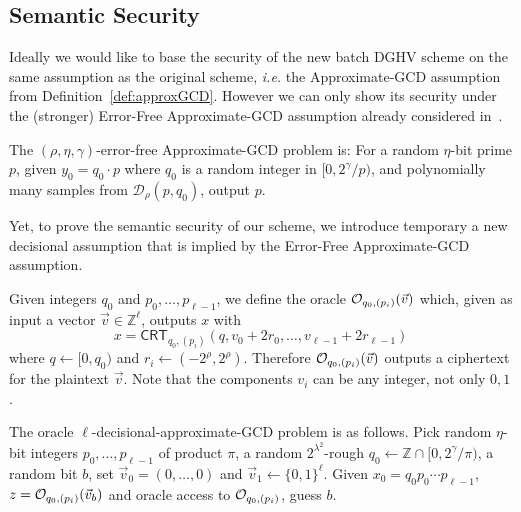 \documentclass[11pt]{llncs}
\newcommand{\ie}{\textsl{i.e.}\xspace}
\newcommand{\Z}{{\mathbb Z}}
\newcommand*{\crt}{\ensuremath{\mathsf{CRT}}}
\begin{document}
\subsection{Semantic Security}\label{sec:semantic-security}

Ideally we would like to base the security of the new batch DGHV scheme on
the same assumption as the original scheme, \ie the
Approximate-GCD assumption from Definition~\ref{def:approxGCD}.
However we can only show its security under the
(stronger) Error-Free Approximate-GCD assumption already considered in~\cite{CMNT2011,CNT2012}.
\begin{definition} 
The $(\rho, \eta,{\gamma})$-error-free Appro\-xi\-ma\-te-GCD pro\-blem
is: For a random $\eta$-bit prime $p$, given $y_0=q_0\cdot p$
where $q_0$ is a random integer in $[0,
  2^{\gamma}/p)$, and polynomially many samples from $\mathcal
  D_\rho(p,q_0)$, output $p$. 
\end{definition} 

Yet, to prove the semantic security of our scheme, 
we introduce temporary a new decisional assumption that is implied by the 
Error-Free Approximate-GCD assumption.

Given integers $q_0$ and $p_0,\ldots,p_{\ell-1}$, we define the oracle
${\cal O}_{q_0,(p_i)}(\vec{v})$ which, given as input a vector $\vec{v} \in {\mathbb
  Z}^\ell$, outputs $x$ with
$$ x = \crt_{q_0,(p_i)}(q,v_0+2r_0,\ldots,v_{\ell-1}+2r_{\ell-1})$$
where $q \leftarrow [0,q_0)$ and $r_i \leftarrow
    (-2^\rho,2^\rho)$. Therefore ${\cal O}_{q_0,(p_i)}(\vec{v})$
    outputs a ciphertext for the plaintext $\vec{v}$. Note that the
    components $v_i$ can be any integer, not only $0,1$.

\begin{definition} The
  oracle $\ell$-decisional-approximate-GCD problem is as
  follows. Pick random $\eta$-bit 
  integers $p_0,\ldots,p_{\ell-1}$ of product $\pi$, a random
  $2^{\lambda^2}$-rough $q_0 \leftarrow \Z \cap  
  [0,2^{\gamma}/\pi)$, a random bit $b$, set $\vec{v}_0=
  (0,\ldots,0)$
and $\vec{v}_1\leftarrow
  \{0,1\}^\ell$. Given  $x_0=q_0p_0\cdots p_{\ell-1}$, $z={\cal O}_{q_0,(p_i)}(\vec{v}_b)$ and oracle access to ${\cal
    O}_{q_0,(p_i)}$, guess $b$.
\end{definition}
 
\end{document}
